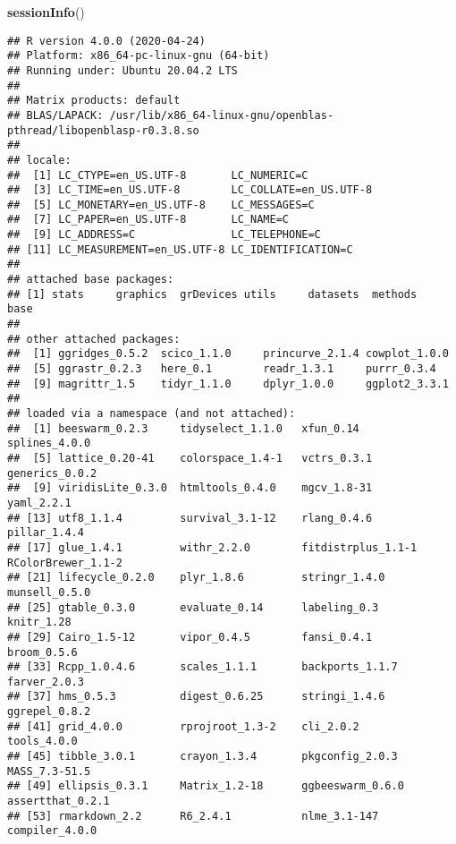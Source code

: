 \documentclass[
]{article}
\newenvironment{Shaded}{\begin{snugshade}}{\end{snugshade}}
\newcommand{\KeywordTok}[1]{\textcolor[rgb]{0.13,0.29,0.53}{\textbf{#1}}}
\newcommand{\NormalTok}[1]{#1}
\begin{document}
\begin{Shaded}
\begin{Highlighting}[]
\KeywordTok{sessionInfo}\NormalTok{()}
\end{Highlighting}
\end{Shaded}

\begin{verbatim}
## R version 4.0.0 (2020-04-24)
## Platform: x86_64-pc-linux-gnu (64-bit)
## Running under: Ubuntu 20.04.2 LTS
## 
## Matrix products: default
## BLAS/LAPACK: /usr/lib/x86_64-linux-gnu/openblas-pthread/libopenblasp-r0.3.8.so
## 
## locale:
##  [1] LC_CTYPE=en_US.UTF-8       LC_NUMERIC=C              
##  [3] LC_TIME=en_US.UTF-8        LC_COLLATE=en_US.UTF-8    
##  [5] LC_MONETARY=en_US.UTF-8    LC_MESSAGES=C             
##  [7] LC_PAPER=en_US.UTF-8       LC_NAME=C                 
##  [9] LC_ADDRESS=C               LC_TELEPHONE=C            
## [11] LC_MEASUREMENT=en_US.UTF-8 LC_IDENTIFICATION=C       
## 
## attached base packages:
## [1] stats     graphics  grDevices utils     datasets  methods   base     
## 
## other attached packages:
##  [1] ggridges_0.5.2  scico_1.1.0     princurve_2.1.4 cowplot_1.0.0  
##  [5] ggrastr_0.2.3   here_0.1        readr_1.3.1     purrr_0.3.4    
##  [9] magrittr_1.5    tidyr_1.1.0     dplyr_1.0.0     ggplot2_3.3.1  
## 
## loaded via a namespace (and not attached):
##  [1] beeswarm_0.2.3     tidyselect_1.1.0   xfun_0.14          splines_4.0.0     
##  [5] lattice_0.20-41    colorspace_1.4-1   vctrs_0.3.1        generics_0.0.2    
##  [9] viridisLite_0.3.0  htmltools_0.4.0    mgcv_1.8-31        yaml_2.2.1        
## [13] utf8_1.1.4         survival_3.1-12    rlang_0.4.6        pillar_1.4.4      
## [17] glue_1.4.1         withr_2.2.0        fitdistrplus_1.1-1 RColorBrewer_1.1-2
## [21] lifecycle_0.2.0    plyr_1.8.6         stringr_1.4.0      munsell_0.5.0     
## [25] gtable_0.3.0       evaluate_0.14      labeling_0.3       knitr_1.28        
## [29] Cairo_1.5-12       vipor_0.4.5        fansi_0.4.1        broom_0.5.6       
## [33] Rcpp_1.0.4.6       scales_1.1.1       backports_1.1.7    farver_2.0.3      
## [37] hms_0.5.3          digest_0.6.25      stringi_1.4.6      ggrepel_0.8.2     
## [41] grid_4.0.0         rprojroot_1.3-2    cli_2.0.2          tools_4.0.0       
## [45] tibble_3.0.1       crayon_1.3.4       pkgconfig_2.0.3    MASS_7.3-51.5     
## [49] ellipsis_0.3.1     Matrix_1.2-18      ggbeeswarm_0.6.0   assertthat_0.2.1  
## [53] rmarkdown_2.2      R6_2.4.1           nlme_3.1-147       compiler_4.0.0
\end{verbatim}
\end{document}
